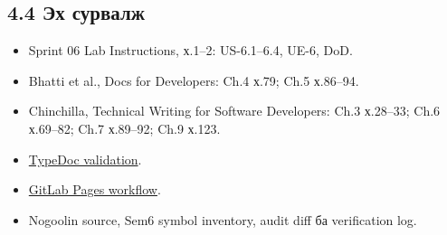 \documentclass[
  mongolian,
]{article}
\providecommand{\tightlist}{%
  \setlength{\itemsep}{0pt}\setlength{\parskip}{0pt}}
\begin{document}
\subsection{4.4 Эх
сурвалж}\label{ux44dux445-ux441ux443ux440ux432ux430ux43bux436}

\begin{itemize}
\tightlist
\item
  Sprint 06 Lab Instructions, х.1--2: US-6.1--6.4, UE-6, DoD.
\item
  Bhatti et al., Docs for Developers: Ch.4 х.79; Ch.5 х.86--94.
\item
  Chinchilla, Technical Writing for Software Developers: Ch.3 х.28--33;
  Ch.6 х.69--82; Ch.7 х.89--92; Ch.9 х.123.
\item
  \href{https://typedoc.org/documents/Options.Validation.html}{TypeDoc
  validation}.
\item
  \href{https://docs.gitlab.com/user/project/pages/getting_started/pages_from_scratch/}{GitLab
  Pages workflow}.
\item
  Nogoolin source, Sem6 symbol inventory, audit diff ба verification
  log.
\end{itemize}
\end{document}
